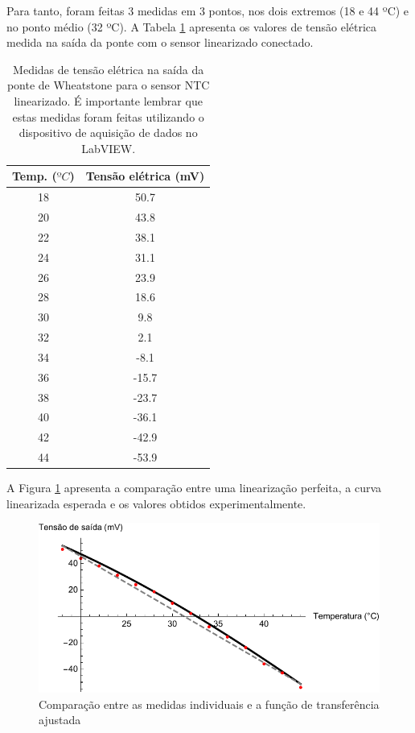 \documentclass[a4paper]{instrumentacao}
\begin{document}
Para tanto, foram feitas 3 medidas em 3 pontos, nos dois extremos (18 e 44 ºC) e no ponto médio (32 ºC). A Tabela \ref{tab:ntc-linearizado} apresenta os valores de tensão elétrica medida na saída da ponte com o sensor linearizado conectado.

\begin{table}[H]
\centering
\caption{Medidas de tensão elétrica na saída da ponte de Wheatstone para o sensor NTC linearizado. É importante lembrar que estas medidas foram feitas utilizando o dispositivo de aquisição de dados no LabVIEW.}
\label{tab:ntc-linearizado}
\begin{tabular}{|c|c|}
\hline
\textbf{Temp. ($ºC$)} & \textbf{Tensão elétrica (mV)} \\ \hline
 18 & 50.7  \\ \hline
 20 & 43.8  \\ \hline
 22 & 38.1  \\ \hline
 24 & 31.1  \\ \hline
 26 & 23.9  \\ \hline
 28 & 18.6  \\ \hline
 30 & 9.8   \\ \hline
 32 & 2.1   \\ \hline
 34 & -8.1  \\ \hline
 36 & -15.7 \\ \hline
 38 & -23.7 \\ \hline
 40 & -36.1 \\ \hline
 42 & -42.9 \\ \hline
 44 & -53.9 \\ \hline
\end{tabular}
\end{table}

A Figura \ref{fig:ntc-experimental-comparacao} apresenta a comparação entre uma linearização perfeita, a curva linearizada esperada e os valores obtidos experimentalmente.

\begin{figure}[H]
\center
\includegraphics[width=\textwidth]{NTC-Linear-Obtido.pdf}
\caption{Comparação entre as medidas individuais e a função de transferência ajustada}
\label{fig:ntc-experimental-comparacao}
\end{figure}
\end{document}
